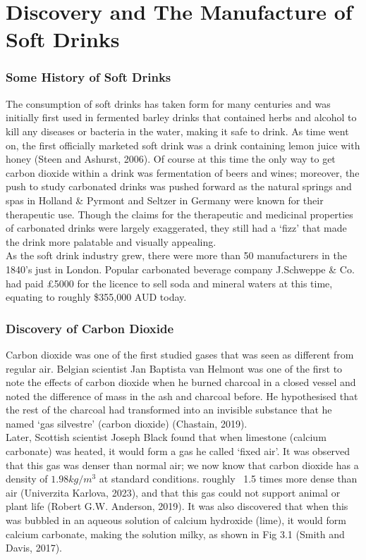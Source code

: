 \chapter{Discovery and The Manufacture of Soft Drinks}\label{ch3}

\subsection{Some History of Soft Drinks}
The consumption of soft drinks has taken form for many centuries and was initially first used in fermented barley drinks that contained herbs and alcohol to kill any diseases or bacteria in the water, making it safe to drink. As time went on, the first officially marketed soft drink was a drink containing lemon juice with honey (Steen and Ashurst, 2006). Of course at this time the only way to get carbon dioxide within a drink was fermentation of beers and wines; moreover, the push to study carbonated drinks was pushed forward as the natural springs and spas in Holland \& Pyrmont and Seltzer in Germany were known for their therapeutic use. Though the claims for the therapeutic and medicinal properties of carbonated drinks were largely exaggerated, they still had a ‘fizz’ that made the drink more palatable and visually appealing. \\

As the soft drink industry grew, there were more than 50 manufacturers in the 1840’s just in London. Popular carbonated beverage company J.Schweppe \& Co. had paid £5000 for the licence to sell soda and mineral waters at this time, equating to roughly \$355,000 AUD today. \\

\subsection{Discovery of Carbon Dioxide}
Carbon dioxide was one of the first studied gases that was seen as different from regular air. Belgian scientist Jan Baptista van Helmont was one of the first to note the effects of carbon dioxide when he burned charcoal in a closed vessel and noted the difference of mass in the ash and charcoal before. He hypothesised that the rest of the charcoal had transformed into an invisible substance that he named ‘gas silvestre’ (carbon dioxide) (Chastain, 2019). \\
Later, Scottish scientist Joseph Black found that when limestone (calcium carbonate) was heated, it would form a gas he called ‘fixed air’. \newpage It was observed that this gas was denser than normal air; we now know that carbon dioxide has a density of \begin{math}1.98 kg/m^3\end{math} at standard conditions. roughly ~1.5 times more dense than air (Univerzita Karlova, 2023), and that this gas could not support animal or plant life (Robert G.W. Anderson, 2019). It was also discovered that when this was bubbled in an aqueous solution of calcium hydroxide (lime), it would form calcium carbonate, making the solution milky, as shown in Fig 3.1 (Smith and Davis, 2017). \\


